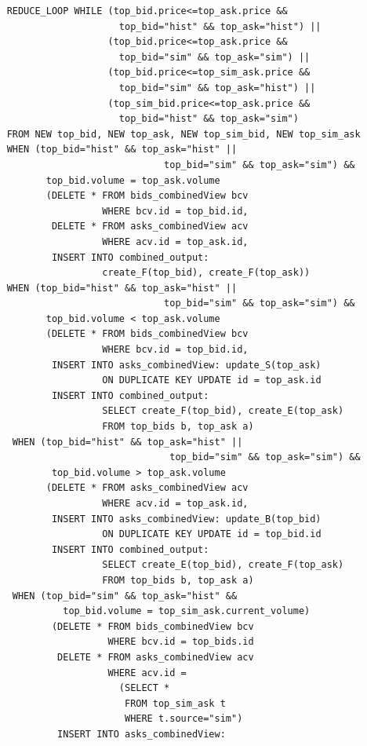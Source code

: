 \documentclass{article}
\begin{document}
\begin{verbatim}  
    REDUCE_LOOP WHILE (top_bid.price<=top_ask.price && 
                        top_bid="hist" && top_ask="hist") ||
                      (top_bid.price<=top_ask.price && 
                        top_bid="sim" && top_ask="sim") ||
                      (top_bid.price<=top_sim_ask.price && 
                        top_bid="sim" && top_ask="hist") ||
                      (top_sim_bid.price<=top_ask.price && 
                        top_bid="hist" && top_ask="sim")
    FROM NEW top_bid, NEW top_ask, NEW top_sim_bid, NEW top_sim_ask
    WHEN (top_bid="hist" && top_ask="hist" ||
                                top_bid="sim" && top_ask="sim") &&
           top_bid.volume = top_ask.volume
           (DELETE * FROM bids_combinedView bcv 
                     WHERE bcv.id = top_bid.id,
            DELETE * FROM asks_combinedView acv 
                     WHERE acv.id = top_ask.id,
            INSERT INTO combined_output:
                     create_F(top_bid), create_F(top_ask))
    WHEN (top_bid="hist" && top_ask="hist" ||
                                top_bid="sim" && top_ask="sim") &&
           top_bid.volume < top_ask.volume                     
           (DELETE * FROM bids_combinedView bcv 
                     WHERE bcv.id = top_bid.id,
            INSERT INTO asks_combinedView: update_S(top_ask) 
                     ON DUPLICATE KEY UPDATE id = top_ask.id
            INSERT INTO combined_output: 
                     SELECT create_F(top_bid), create_E(top_ask)
                     FROM top_bids b, top_ask a)
     WHEN (top_bid="hist" && top_ask="hist" ||
                                 top_bid="sim" && top_ask="sim") &&
            top_bid.volume > top_ask.volume                     
           (DELETE * FROM asks_combinedView acv 
                     WHERE acv.id = top_ask.id,
            INSERT INTO asks_combinedView: update_B(top_bid) 
                     ON DUPLICATE KEY UPDATE id = top_bid.id
            INSERT INTO combined_output: 
                     SELECT create_E(top_bid), create_F(top_ask)
                     FROM top_bids b, top_ask a)
     WHEN (top_bid="sim" && top_ask="hist" &&
              top_bid.volume = top_sim_ask.current_volume)
            (DELETE * FROM bids_combinedView bcv
                      WHERE bcv.id = top_bids.id
             DELETE * FROM asks_combinedView acv
                      WHERE acv.id = 
                        (SELECT *
                         FROM top_sim_ask t
                         WHERE t.source="sim")
             INSERT INTO asks_combinedView: 

\end{verbatim}
\end{document}
